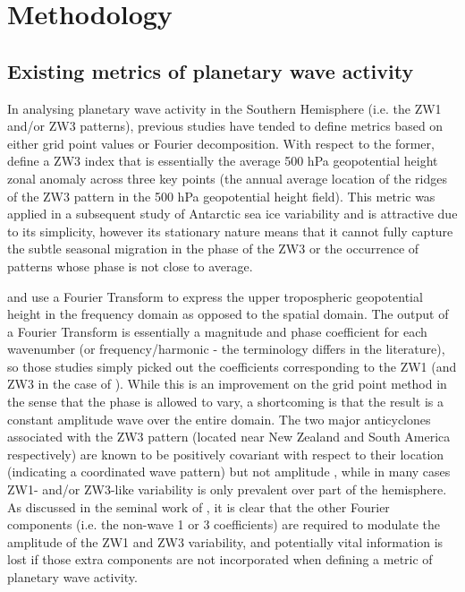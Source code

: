 \section{Methodology}\label{s:methodology}

\subsection{Existing metrics of planetary wave activity}\label{s:existing_metrics}

In analysing planetary wave activity in the Southern Hemisphere (i.e. the ZW1 and/or ZW3 patterns), previous studies have tended to define metrics based on either grid point values or Fourier decomposition. With respect to the former, \citet{Raphael2004} define a ZW3 index that is essentially the average 500 hPa geopotential height zonal anomaly across three key points (the annual average location of the ridges of the ZW3 pattern in the 500 hPa geopotential height field). This metric was applied in a subsequent study of Antarctic sea ice variability \citep{Raphael2007} and is attractive due to its simplicity, however its stationary nature means that it cannot fully capture the subtle \citep[but not insignificant at around 15 degrees of longitude on average;][]{vanLoon1984,Mo1985} seasonal migration in the phase of the ZW3 or the occurrence of patterns whose phase is not close to average.

\citet{Hobbs2007} and \citet{Hobbs2010} use a Fourier Transform to express the upper tropospheric geopotential height in the frequency domain as opposed to the spatial domain. The output of a Fourier Transform is essentially a magnitude and phase coefficient for each wavenumber (or frequency/harmonic - the terminology differs in the literature), so those studies simply picked out the coefficients corresponding to the ZW1 (and ZW3 in the case of \citet{Hobbs2010}). While this is an improvement on the grid point method in the sense that the phase is allowed to vary, a shortcoming is that the result is a constant amplitude wave over the entire domain. The two major anticyclones associated with the ZW3 pattern (located near New Zealand and South America respectively) are known to be positively covariant with respect to their location (indicating a coordinated wave pattern) but not amplitude \citep{Hobbs2010}, while in many cases ZW1- and/or ZW3-like variability is only prevalent over part of the hemisphere. As discussed in the seminal work of \citet{vanLoon1972}, it is clear that the other Fourier components (i.e. the non-wave 1 or 3 coefficients) are required to modulate the amplitude of the ZW1 and ZW3 variability, and potentially vital information is lost if those extra components are not incorporated when defining a metric of planetary wave activity. 

